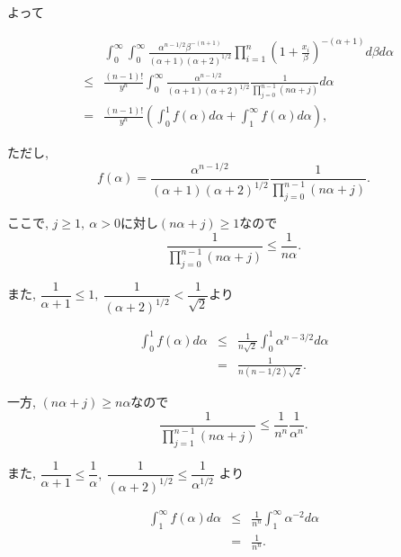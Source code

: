 \documentclass[12pt,dvipdfmx]{beamer}
\begin{document}
\begin{frame}


よって

\begin{eqnarray*}
&&\int_{0}^{\infty}\int_{0}^{\infty}
\frac{\alpha ^{n-1/2}\beta ^{-(n+1)}}{(\alpha +1)(\alpha +2)^{1/2}}
\prod_{i=1}^{n}\left(1+\frac{x_{i}}{\beta }\right)^{-(\alpha +1)}d\beta d\alpha \\
&\leq&
\frac{(n-1)!}{y^{n}}\int_{0}^{\infty}
\frac{\alpha ^{n-1/2}}{(\alpha +1)(\alpha +2)^{1/2}}
\frac{1}{\prod_{j=0}^{n-1}(n\alpha +j)}d\alpha \\
&=&
\frac{(n-1)!}{y^{n}}\left(
\int_{0}^{1}f(\alpha )d\alpha +\int_{1}^{\infty}f(\alpha )d\alpha 
\right),
\end{eqnarray*}

ただし, 
$$
f(\alpha)=
\frac{\alpha ^{n-1/2}}{(\alpha +1)(\alpha +2)^{1/2}}
\frac{1}{\prod_{j=0}^{n-1}(n\alpha +j)}. 
$$


\end{frame}



\begin{frame}

ここで, $j\geq 1,~\alpha >0$に対し$(n\alpha +j) \geq 1$なので
$$
\frac{1}{\prod_{j=0}^{n-1}(n\alpha +j)}
\leq
\frac{1}{n\alpha }. 
$$

また, $\dfrac{1}{\alpha +1} \leq1,~\dfrac{1}{(\alpha +2)^{1/2}}<\dfrac{1}{\sqrt{2}}$より

\begin{eqnarray*}
\int_{0}^{1}f(\alpha)d\alpha
&\leq &
\frac{1}{n\sqrt{2}}\int_{0}^{1}\alpha^{n-3/2}d\alpha \\
&=&
\frac{1}{n(n-1/2)\sqrt{2}}.
\end{eqnarray*}

\end{frame}



\begin{frame}
一方, $(n\alpha +j)\geq n\alpha$なので
$$
\frac{1}{\prod_{j=1}^{n-1}(n\alpha +j)}
\leq
\frac{1}{n^{n}}\frac{1}{\alpha^{n}}. 
$$

また, $\dfrac{1}{\alpha +1}\leq \dfrac{1}{\alpha },
~\dfrac{1}{(\alpha +2)^{1/2}}\leq \dfrac{1}{\alpha ^{1/2}}$
より

\begin{eqnarray*}
\int_{1}^{\infty}f(\alpha )d\alpha
&\leq &
\frac{1}{n^{n}}\int_{1}^{\infty}\alpha ^{-2}d\alpha \\
&=&
\frac{1}{n^{n}}.
\end{eqnarray*}

\end{frame}
\end{document}

